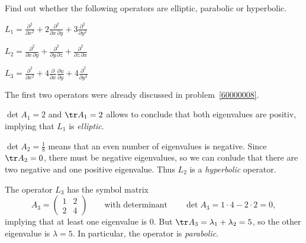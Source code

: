 Find out whether the following operators are elliptic, parabolic or
hyperbolic.
\begin{teilaufgaben}
\item
$
\displaystyle
L_1
=
\frac{\partial^2}{\partial x^2}
+
2\frac{\partial^2}{\partial x\,\partial y}
+
3\frac{\partial^2}{\partial y^2}
$
\item
$
\displaystyle
L_2
=
\frac{\partial^2}{\partial x\,\partial y}
+
\frac{\partial^2}{\partial y\,\partial z}
+
\frac{\partial^2}{\partial z\,\partial x}
$
\item
$
\displaystyle
L_3
=
\frac{\partial^2}{\partial x^2}
+
4\frac{\partial }{\partial x}\frac{\partial u}{\partial y}
+
4\frac{\partial^2}{\partial y^2}
$
\end{teilaufgaben}

\begin{loesung}
The first two operators were already discussed in problem~\ref{60000008}.
\begin{teilaufgaben}
\item 
$\det A_1 = 2$ and $\tr A_1=2$ allows to conclude that both eigenvalues
are positiv, implying that $L_1$ is {\em elliptic}.
\item
$\det A_2 = \frac18$ means that an even number of
eigenvalues is negative.
Since $\tr A_2=0$, there must be negative eigenvalues, so we can conlude
that there are two negative and one positive eigenvalue.
Thus $L_2$ is a {\em hyperbolic} operator.
\item
The operator $L_3$ has the symbol matrix
\[
A_3
=
\begin{pmatrix}
1&2\\
2&4
\end{pmatrix}
\qquad
\text{with determinant}
\qquad
\det A_3
=
1\cdot 4 - 2\cdot 2
=
0,
\]
implying that at least one eigenvalue is $0$.
But $\tr A_3 =\lambda_1+\lambda_2 = 5$, so the other eigenvalue is
$\lambda=5$.
In particular, the operator is {\em parabolic}.
\qedhere
\end{teilaufgaben}
\end{loesung}
